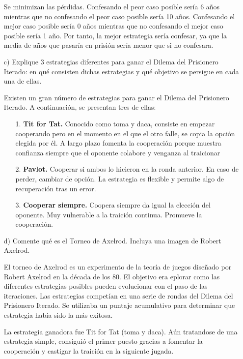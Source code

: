 \documentclass{llncs}
\begin{document}
\begin{enumerate}
		\vspace{0.25cm}
		Se minimizan las pérdidas. Confesando el peor caso posible sería 6 años mientras que no confesando el peor caso posible sería 10 años. Confesando el mejor caso posible sería 0 años mientras que no confesando el mejor caso posible sería 1 año. Por tanto, la mejor estrategia sería confesar, ya que la media de años que pasaría en prisión sería menor que si no confesara.

	\vspace{0.5cm}
	\item [c)] Explique 3 estrategias diferentes para ganar el Dilema del Prisionero Iterado: en qué consisten dichas estrategias y qué objetivo se persigue en cada una de ellas.

		\vspace{0.25cm}
		Existen un gran número de estrategias para ganar el Dilema del Prisionero Iterado. A continuación, se presentan tres de ellas:

		\begin{itemize}
			\item [1.] \textbf{Tit for Tat.} Conocido como toma y daca, consiste en empezar cooperando pero en el momento en el que el otro falle, se copia la opción elegida por él. A largo plazo fomenta la cooperación porque muestra confianza siempre que el oponente colabore y venganza al traicionar
			\item [2.] \textbf{Pavlot.} Cooperar si ambos lo hicieron en la ronda anterior. En caso de perder, cambiar de opción. La estrategia es flexible y permite algo de recuperación tras un error.
			\item [3.] \textbf{Cooperar siempre.} Coopera siempre da igual la elección del oponente. Muy vulnerable a la traición continua. Promueve la cooperación.
		\end{itemize}


	\vspace{0.5cm}
	\item [d)] Comente qué es el Torneo de Axelrod. Incluya una imagen de Robert Axelrod.

	\vspace{0.25cm}
	El torneo de Axelrod es un experimento de la teoría de juegos diseñado por Robert Axelrod en la década de los 80. El objetivo era eplorar como las diferentes estrategias posibles pueden evolucionar con el paso de las iteraciones. Las estrategias competían en una serie de rondas del Dilema del Prisionero Iterado. Se utilizaba un puntaje acumulativo para determinar que estrategia había sido la más exitosa.

	\vspace{0.25cm}
	La estrategia ganadora fue Tit for Tat (toma y daca). Aún tratandose de una estrategia simple, consiguió el primer puesto gracias a fomentar la cooperación y castigar la traición en la siguiente jugada.
	
\end{enumerate}
\end{document}
